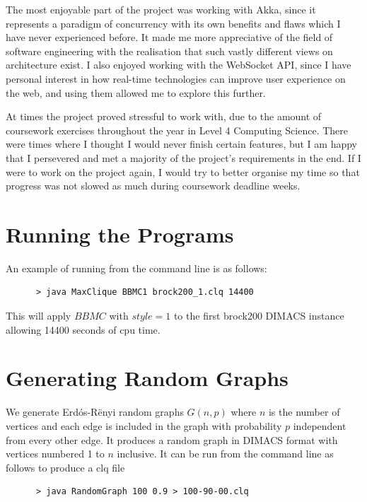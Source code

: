 \documentclass{l4proj}
\begin{document}
    The most enjoyable part of the project was working with Akka, since it represents a paradigm of concurrency with its own benefits and flaws which I have never experienced before. It made me more appreciative of the field of software engineering with the realisation that such vastly different views on architecture exist. I also enjoyed working with the WebSocket API, since I have personal interest in how real-time technologies can improve user experience on the web, and using them allowed me to explore this further.
    
    At times the project proved stressful to work with, due to the amount of coursework exercises throughout the year in Level 4 Computing Science. There were times where I thought I would never finish certain features, but I am happy that I persevered and met a majority of the project's requirements in the end. If I were to work on the project again, I would try to better organise my time so that progress was not slowed as much during coursework deadline weeks.

\begin{appendices}

\chapter{Running the Programs}
An example of running from the command line is as follows:
\begin{verbatim}
      > java MaxClique BBMC1 brock200_1.clq 14400
\end{verbatim}
This will apply $BBMC$ with $style = 1$ to the first brock200 DIMACS instance allowing 14400 seconds of cpu time.

\chapter{Generating Random Graphs}
\label{sec:randomGraph}
We generate Erd\'{o}s-R\"{e}nyi random graphs $G(n,p)$ where $n$ is the number of vertices and
each edge is included in the graph with probability $p$ independent from every other edge. It produces
a random graph in DIMACS format with vertices numbered 1 to $n$ inclusive. It can be run from the command line as follows to produce 
a clq file
\begin{verbatim}
      > java RandomGraph 100 0.9 > 100-90-00.clq
\end{verbatim}
\end{appendices}




\end{document}
